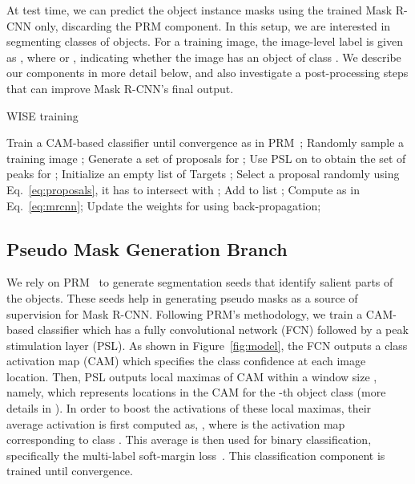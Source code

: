 \documentclass{bmvc2k}
\begin{document}
At test time, we can predict the object instance masks using the trained Mask R-CNN only, discarding the PRM component. In this setup, we are interested in segmenting  classes of objects. For a training image, the image-level label is given as , where  or , indicating whether the image has an object of class . We describe our components in more detail below, and also investigate a post-processing steps that can improve Mask R-CNN's final output. 


\begin{algorithm}[t]
  \caption{WISE training}
\begin{algorithmic}[1]
    \State Train a CAM-based classifier  until convergence as in PRM~\cite{Zhou2018PRM};
    \While {}
      \State Randomly sample a training image ;
      \State Generate a set of proposals  for ;
      \State Use PSL on  to obtain the set of peaks  for ;
      \State Initialize an empty list of Targets ;
      \For {}
        \State Select a proposal   randomly using Eq.~\ref{eq:proposals}, it has to intersect with ;
        \State Add  to list ;
      \EndFor
     \State Compute  as in Eq.~\ref{eq:mrcnn};
     \State Update the weights for  using back-propagation;
    \EndWhile
  \end{algorithmic}
\label{alg:TheAlgorithm}
\end{algorithm}

\subsection{Pseudo Mask Generation Branch}
We rely on PRM~\cite{Zhou2018PRM} to generate segmentation seeds that identify salient parts of the objects. These seeds help in generating pseudo masks as a source of supervision for Mask R-CNN. Following PRM's methodology, we train a CAM-based classifier which has a fully convolutional network (FCN) followed by a peak stimulation layer (PSL). As shown in Figure~\ref{fig:model}, the FCN outputs a class activation map (CAM) which specifies the class confidence at each image location. Then, PSL outputs  local maximas of CAM within a window size , namely,  which represents locations in the CAM for the -th object class (more details in \citet{Zhou2018PRM}). In order to boost the activations of these local maximas, their average activation is first computed as, , where  is the activation map corresponding to class . This average is then used for binary classification, specifically the multi-label soft-margin loss~\cite{lapin2018analysis}. This classification component is trained until convergence.
\end{document}
